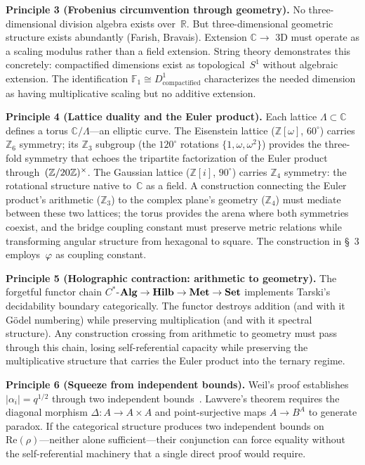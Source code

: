 \textbf{Principle 3 (Frobenius circumvention through geometry).}
No three-dimensional division algebra exists over~$\mathbb{R}$.  But
three-dimensional geometric structure exists abundantly (Farish,
Bravais).  Extension $\mathbb{C} \to$ 3D must operate as a scaling
modulus rather than a field extension.  String theory demonstrates this
concretely: compactified dimensions exist as topological~$S^1$ without
algebraic extension.  The identification
$\mathbb{F}_1 \cong D^1_{\text{compactified}}$ characterizes the
needed dimension as having multiplicative scaling but no additive
extension.

\textbf{Principle 4 (Lattice duality and the Euler product).}
Each lattice $\Lambda \subset \mathbb{C}$ defines a torus
$\mathbb{C}/\Lambda$---an elliptic curve.
The Eisenstein lattice ($\mathbb{Z}[\omega]$, $60^\circ$) carries
$\mathbb{Z}_6$ symmetry; its $\mathbb{Z}_3$ subgroup (the $120^\circ$
rotations $\{1,\omega,\omega^2\}$) provides the three-fold symmetry
that echoes the tripartite factorization of the Euler product
through~$(\mathbb{Z}/20\mathbb{Z})^\times$.
The Gaussian lattice ($\mathbb{Z}[i]$, $90^\circ$) carries $\mathbb{Z}_4$
symmetry: the rotational structure native to~$\mathbb{C}$ as a field.
A construction connecting the Euler product's arithmetic
($\mathbb{Z}_3$) to the complex plane's geometry ($\mathbb{Z}_4$)
must mediate between these two lattices; the torus provides the arena
where both symmetries coexist, and the bridge coupling constant must
preserve metric relations while transforming angular structure from
hexagonal to square.  The construction in \S~3 employs~$\varphi$
as coupling constant.

\textbf{Principle 5 (Holographic contraction: arithmetic to geometry).}
The forgetful functor chain
$C^*$-$\mathbf{Alg} \to \mathbf{Hilb} \to \mathbf{Met} \to \mathbf{Set}$
implements Tarski's decidability boundary categorically.
The functor destroys addition (and with it G\"odel numbering) while
preserving multiplication (and with it spectral structure).  Any
construction crossing from arithmetic to geometry must pass through
this chain, losing self-referential capacity while preserving the
multiplicative structure that carries the Euler product into the
ternary regime.

\textbf{Principle 6 (Squeeze from independent bounds).}
Weil's proof establishes $|\alpha_i| = q^{1/2}$ through two independent
bounds~\cite{oort14,milne15}.  Lawvere's theorem requires the diagonal morphism
$\Delta\colon A \to A \times A$ and point-surjective maps $A \to B^A$
to generate paradox.  If the categorical structure produces two
independent bounds on $\mathrm{Re}(\rho)$---neither alone
sufficient---their conjunction can force equality without the
self-referential machinery that a single direct proof would require.
